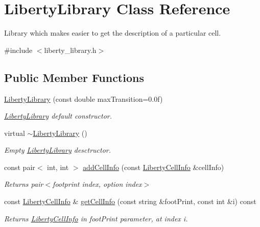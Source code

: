 \hypertarget{classLibertyLibrary}{\section{Liberty\-Library Class Reference}
\label{classLibertyLibrary}
}


Library which makes easier to get the description of a particular cell.  




{\ttfamily \#include $<$liberty\-\_\-library.\-h$>$}

\subsection*{Public Member Functions}
\begin{DoxyCompactItemize}
\item 
\hyperlink{classLibertyLibrary_a3b7513ef68e791245f60e16f6b4ee5d4}{Liberty\-Library} (const double max\-Transition=0.\-0f)
\begin{DoxyCompactList}\small\item\em \hyperlink{classLibertyLibrary}{Liberty\-Library} default constructor. \end{DoxyCompactList}\item 
virtual \hyperlink{classLibertyLibrary_ade99b2247c7d5eb9ef885bc4ec57091d}{$\sim$\-Liberty\-Library} ()
\begin{DoxyCompactList}\small\item\em Empty \hyperlink{classLibertyLibrary}{Liberty\-Library} desctructor. \end{DoxyCompactList}\item 
const pair$<$ int, int $>$ \hyperlink{classLibertyLibrary_a4d9ec0ea6af3949878d9b14042e761e6}{add\-Cell\-Info} (const \hyperlink{structLibertyCellInfo}{Liberty\-Cell\-Info} \&cell\-Info)
\begin{DoxyCompactList}\small\item\em Returns pair$<$footprint index, option index$>$ \end{DoxyCompactList}\item 
const \hyperlink{structLibertyCellInfo}{Liberty\-Cell\-Info} \& \hyperlink{classLibertyLibrary_a917ae50f0af17b1b68be754f1ae6dd07}{get\-Cell\-Info} (const string \&foot\-Print, const int \&i) const 
\begin{DoxyCompactList}\small\item\em Returns \hyperlink{structLibertyCellInfo}{Liberty\-Cell\-Info} in foot\-Print parameter, at index i. \end{DoxyCompactList}\item 

\end{DoxyCompactItemize}

